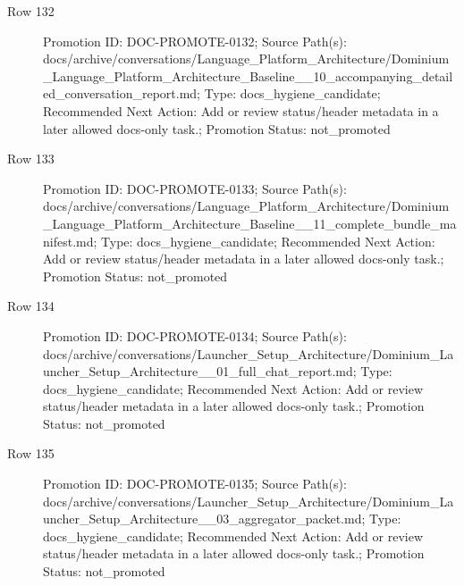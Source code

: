 \documentclass[9pt,a4paper,openany]{book}
\begin{document}
\begin{description}
\item[Row 132] Promotion ID: DOC-\allowbreak{}PROMOTE-\allowbreak{}0132; Source Path(s): docs/\allowbreak{}archive/\allowbreak{}conversations/\allowbreak{}Language\_\allowbreak{}Platform\_\allowbreak{}Architecture/\allowbreak{}Dominium\_\allowbreak{}Language\_\allowbreak{}Platform\_\allowbreak{}Architecture\_\allowbreak{}Baseline\_\allowbreak{}\_\allowbreak{}10\_\allowbreak{}accompanying\_\allowbreak{}detailed\_\allowbreak{}conversation\_\allowbreak{}report.\allowbreak{}md; Type: docs\_\allowbreak{}hygiene\_\allowbreak{}candidate; Recommended Next Action: Add or review status/\allowbreak{}header metadata in a later allowed docs-\allowbreak{}only task.\allowbreak{}; Promotion Status: not\_\allowbreak{}promoted
\item[Row 133] Promotion ID: DOC-\allowbreak{}PROMOTE-\allowbreak{}0133; Source Path(s): docs/\allowbreak{}archive/\allowbreak{}conversations/\allowbreak{}Language\_\allowbreak{}Platform\_\allowbreak{}Architecture/\allowbreak{}Dominium\_\allowbreak{}Language\_\allowbreak{}Platform\_\allowbreak{}Architecture\_\allowbreak{}Baseline\_\allowbreak{}\_\allowbreak{}11\_\allowbreak{}complete\_\allowbreak{}bundle\_\allowbreak{}manifest.\allowbreak{}md; Type: docs\_\allowbreak{}hygiene\_\allowbreak{}candidate; Recommended Next Action: Add or review status/\allowbreak{}header metadata in a later allowed docs-\allowbreak{}only task.\allowbreak{}; Promotion Status: not\_\allowbreak{}promoted
\item[Row 134] Promotion ID: DOC-\allowbreak{}PROMOTE-\allowbreak{}0134; Source Path(s): docs/\allowbreak{}archive/\allowbreak{}conversations/\allowbreak{}Launcher\_\allowbreak{}Setup\_\allowbreak{}Architecture/\allowbreak{}Dominium\_\allowbreak{}Launcher\_\allowbreak{}Setup\_\allowbreak{}Architecture\_\allowbreak{}\_\allowbreak{}01\_\allowbreak{}full\_\allowbreak{}chat\_\allowbreak{}report.\allowbreak{}md; Type: docs\_\allowbreak{}hygiene\_\allowbreak{}candidate; Recommended Next Action: Add or review status/\allowbreak{}header metadata in a later allowed docs-\allowbreak{}only task.\allowbreak{}; Promotion Status: not\_\allowbreak{}promoted
\item[Row 135] Promotion ID: DOC-\allowbreak{}PROMOTE-\allowbreak{}0135; Source Path(s): docs/\allowbreak{}archive/\allowbreak{}conversations/\allowbreak{}Launcher\_\allowbreak{}Setup\_\allowbreak{}Architecture/\allowbreak{}Dominium\_\allowbreak{}Launcher\_\allowbreak{}Setup\_\allowbreak{}Architecture\_\allowbreak{}\_\allowbreak{}03\_\allowbreak{}aggregator\_\allowbreak{}packet.\allowbreak{}md; Type: docs\_\allowbreak{}hygiene\_\allowbreak{}candidate; Recommended Next Action: Add or review status/\allowbreak{}header metadata in a later allowed docs-\allowbreak{}only task.\allowbreak{}; Promotion Status: not\_\allowbreak{}promoted

\end{description}
\end{document}
